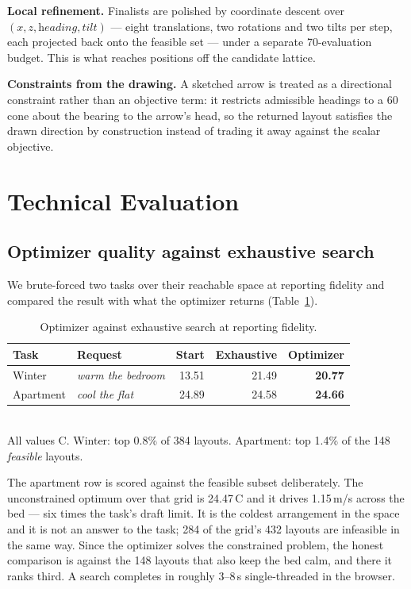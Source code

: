 \documentclass[manuscript,review,anonymous]{acmart}
\begin{document}
\textbf{Local refinement.} Finalists are polished by coordinate descent over
$(x, z, \textit{heading}, \textit{tilt})$ --- eight translations, two rotations
and two tilts per step, each projected back onto the feasible set --- under a
separate 70-evaluation budget. This is what reaches positions off the candidate
lattice.

\textbf{Constraints from the drawing.} A sketched arrow is treated as a
directional constraint rather than an objective term: it restricts admissible
headings to a 60\textdegree{} cone about the bearing to the arrow's head, so the
returned layout satisfies the drawn direction by construction instead of trading
it away against the scalar objective.

\section{Technical Evaluation}
\label{sec:technical}

\subsection{Optimizer quality against exhaustive search}

We brute-forced two tasks over their reachable space at reporting fidelity and
compared the result with what the optimizer returns
(Table~\ref{tab:optimizer}).

\begin{table}[t]
  \caption{Optimizer against exhaustive search at reporting fidelity.}
  \label{tab:optimizer}
  \small
  \begin{tabular}{llrrr}
    \toprule
    Task & Request & Start & Exhaustive & Optimizer \\
    \midrule
    Winter & \emph{warm the bedroom} & 13.51 & 21.49 & \textbf{20.77} \\
    Apartment & \emph{cool the flat} & 24.89 & 24.58 & \textbf{24.66} \\
    \bottomrule
  \end{tabular}
  \\[2pt]
  \footnotesize All values \textdegree C. Winter: top 0.8\% of 384 layouts.
  Apartment: top 1.4\% of the 148 \emph{feasible} layouts.
\end{table}

The apartment row is scored against the feasible subset deliberately. The
unconstrained optimum over that grid is 24.47\,\textdegree C and it drives
1.15\,m/s across the bed --- six times the task's draft limit. It is the coldest
arrangement in the space and it is not an answer to the task; 284 of the grid's
432 layouts are infeasible in the same way. Since the optimizer solves the
constrained problem, the honest comparison is against the 148 layouts that also
keep the bed calm, and there it ranks third. A search completes in roughly
3--8\,s single-threaded in the browser.
\end{document}
